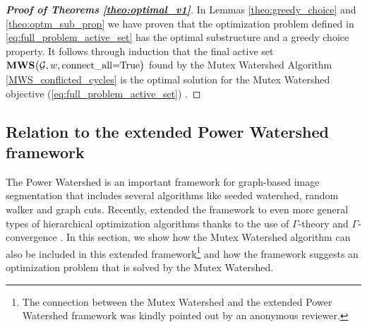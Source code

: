 \begin{proof}[\textbf{Proof of Theorems \ref{theo:optimal_v1}}]%
In Lemmas \ref{theo:greedy_choice} and \ref{theo:optm_sub_prop} we have proven that the optimization problem defined in \ref{eq:full_problem_active_set} has the optimal substructure and a greedy choice property. 
It follows through induction that the final active set $\mathbf{MWS}\big(\mathcal{G}, w, \textrm{connect\_all=True}\big)$ found by the Mutex Watershed Algorithm \ref{MWS_conflicted_cycles} is the optimal solution for the Mutex Watershed objective (\ref{eq:full_problem_active_set}) \cite{cormen2009introduction}.
\end{proof}




\subsection{Relation to the extended Power Watershed framework}\label{sec:power_ws}
The Power Watershed \cite{powerws} is an important framework for graph-based image segmentation that includes several algorithms like seeded watershed, random walker and graph cuts. Recently, \cite{najman2017extending} extended the framework to even more general types of hierarchical optimization algorithms thanks to the use of $\Gamma$-theory and \mbox{$\Gamma$-convergence} \cite{dal2012introduction,braides2006handbook}.
In this section, we show how the Mutex Watershed algorithm can also be included in this extended framework\footnote{The connection between the Mutex Watershed and the extended Power Watershed framework was kindly pointed out by an anonymous reviewer.} and how the framework suggests an optimization problem that is solved by the Mutex Watershed.

